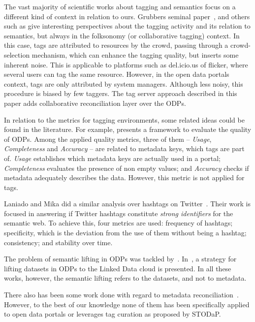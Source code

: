\documentclass[conference]{IEEEtran}
\begin{document}
The vast majority of scientific works about tagging and semantics focus on a different kind of context in relation to ours.
Grubbers seminal paper~\cite{Grubber2007}, and others such as \cite{Halpin2007, Marchetti2007, Knerr2006, Mika2007, Kim2008, Kim2011} give interesting perspectives about the tagging activity and its relation to semantics, but always in the folksonomy (or collaborative tagging) context.
In this case, tags are attributed to resources by the crowd, passing through a crowd-selection mechanism, which can enhance the tagging quality, but inserts some inherent noise.
This is applicable to platforms such as del.icio.us of flicker, where several users can tag the same resource.
However, in the open data portals context, tags are only attributed by system managers.
Although less noisy, this procedure is biased by few taggers.
The tag server approach described in this paper adds collaborative reconciliation layer over the ODPs.

In relation to the metrics for tagging environments, some related ideas could be found in the literature.
For example, \cite{Umbrich2015} presents a framework to evaluate the quality of ODPs. 
Among the applied quality metrics, three of them -- \emph{Usage}, \emph{Completeness} and \emph{Accuracy} -- are related to metadata keys, which tags are part of. 
\emph{Usage} establishes which metadata keys are actually used in a portal; \emph{Completeness} evaluates the presence of non empty values; and \emph{Accuracy} checks if metadata adequately describes the data.
However, this metric is not applied for tags.

Laniado and Mika did a similar analysis over hashtags on Twitter~\cite{Laniado2010}.
Their work is focused in answering if Twitter hashtags constitute \emph{strong identifiers} for the semantic web. 
To achieve this, four metrics are used: frequency of hashtags; specificity, which is the deviation from the use of them without being a hashtag; consistency; and stability over time.

The problem of semantic lifting in ODPs was tackled by~\cite{DBLP:conf/i-semantics/ErmilovAS13,Ding2011325}. 
In~\cite{Waal2014}, a strategy for lifting datasets in ODPs to the Linked Data cloud is presented. 
In all these works, however, the semantic lifting refers to the datasets, and not to metadata.

There also has been some work done with regard to metadata reconciliation~\cite{6406217,vanhooland_dh_2012}.
However, to the best of our knowledge none of them has been specifically applied to open data portals or leverages tag curation as proposed by STODaP.
\end{document}
